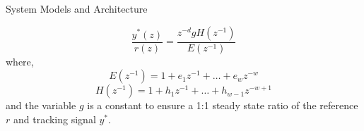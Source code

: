 \begin{section}{System Models and Architecture}
	



	\begin{equation}
	\label{eq:reference model_z}
	\frac{y^*(z)}{r(z)}=\frac{z^{-d}gH(z^{-1})}{E(z^{-1})}
	\end{equation}
where,
    \begin{equation}
    \label{eq:E_q}
	E(z^{-1})=1+e_1z^{-1}+ \dots +e_wz^{-w}
	\end{equation}
	\begin{equation}
	H(z^{-1})=1+h_1z^{-1}+ \dots +h_{w-1}z^{-w+1}
	\end{equation}
and the variable $g$ is a constant to ensure a 1:1 steady state ratio of the reference $r$ and tracking signal $y^*$. 



\end{section}